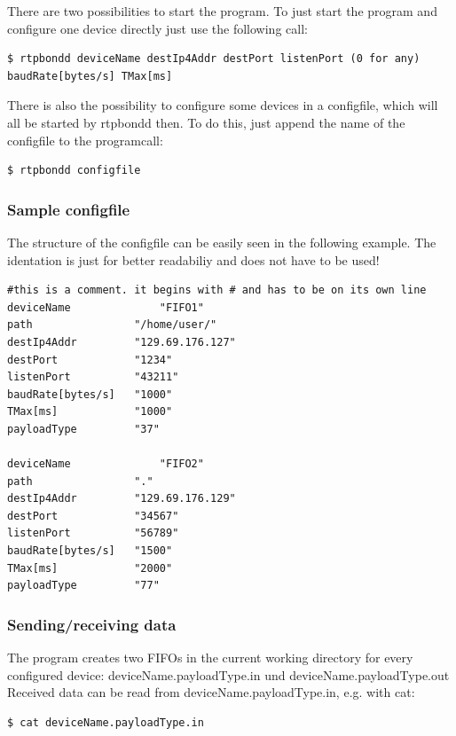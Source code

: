 \documentclass[a4paper]{book}%
\begin{document}
There are two possibilities to start the program. To just start the program and configure one device directly just use the following call:

\begin{verbatim}
$ rtpbondd deviceName destIp4Addr destPort listenPort (0 for any) baudRate[bytes/s] TMax[ms]
\end{verbatim}

There is also the possibility to configure some devices in a configfile, which will all be started by rtpbondd then. To do this, just append the name of the configfile to the programcall:

\begin{verbatim}
$ rtpbondd configfile
\end{verbatim}

\subsubsection{Sample configfile}

The structure of the configfile can be easily seen in the following example. The identation is just for better readabiliy and does not have to be used!


\begin{verbatim}
#this is a comment. it begins with # and has to be on its own line
deviceName              "FIFO1"
path                "/home/user/"
destIp4Addr         "129.69.176.127"
destPort            "1234"
listenPort          "43211"
baudRate[bytes/s]   "1000"
TMax[ms]            "1000"
payloadType         "37"

deviceName              "FIFO2"
path                "."
destIp4Addr         "129.69.176.129"
destPort            "34567"
listenPort          "56789"
baudRate[bytes/s]   "1500"
TMax[ms]            "2000"
payloadType         "77"
\end{verbatim}


\subsubsection{Sending/receiving data}

The program creates two FIFOs in the current working directory for every configured device: deviceName.payloadType.in und deviceName.payloadType.out
Received data can be read from deviceName.payloadType.in, e.g. with cat:

\begin{verbatim}
$ cat deviceName.payloadType.in
\end{verbatim}
\end{document}
